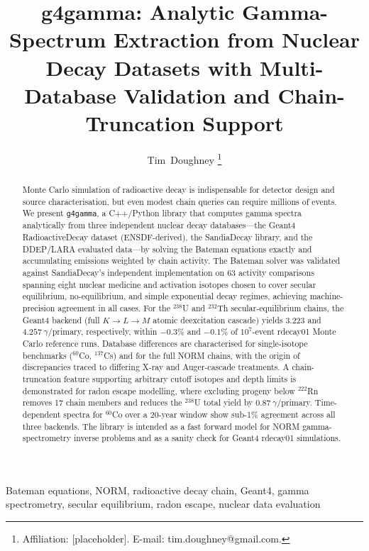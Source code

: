 \documentclass[journal]{IEEEtran}
\title{g4gamma: Analytic Gamma-Spectrum Extraction from Nuclear Decay Datasets
       with Multi-Database Validation and Chain-Truncation Support}
\author{Tim~Doughney%
  \thanks{Affiliation: [placeholder]. E-mail: tim.doughney@gmail.com.}%
}
\begin{document}
\maketitle

\begin{abstract}
Monte Carlo simulation of radioactive decay is indispensable for detector design and
source characterisation, but even modest chain queries can require millions of events.
We present \texttt{g4gamma}, a C++/Python library that computes gamma spectra
analytically from three independent nuclear decay databases---the Geant4
RadioactiveDecay dataset (ENSDF-derived), the SandiaDecay library, and the DDEP/LARA
evaluated data---by solving the Bateman equations exactly and accumulating emissions
weighted by chain activity.
The Bateman solver was validated against SandiaDecay's independent implementation
on 63 activity comparisons spanning eight nuclear medicine and activation isotopes
chosen to cover secular equilibrium, no-equilibrium, and simple exponential
decay regimes, achieving machine-precision agreement in all cases.
For the $^{238}$U and $^{232}$Th secular-equilibrium chains, the Geant4 backend
(full $K\to L\to M$ atomic deexcitation cascade) yields
$3.223$ and $4.257\ \gamma$/primary, respectively, within $-0.3$\% and $-0.1$\%
of $10^7$-event rdecay01 Monte Carlo reference runs.
Database differences are characterised for single-isotope benchmarks ($^{60}$Co,
$^{137}$Cs) and for the full NORM chains, with the origin of discrepancies traced
to differing X-ray and Auger-cascade treatments.
A chain-truncation feature supporting arbitrary cutoff isotopes and depth limits is
demonstrated for radon escape modelling, where excluding progeny below $^{222}$Rn
removes 17 chain members and reduces the $^{238}$U total yield by
$0.87\ \gamma$/primary.
Time-dependent spectra for $^{60}$Co over a 20-year window show sub-1\% agreement
across all three backends.
The library is intended as a fast forward model for NORM gamma-spectrometry inverse
problems and as a sanity check for Geant4 rdecay01 simulations.
\end{abstract}

\begin{IEEEkeywords}
Bateman equations, NORM, radioactive decay chain, Geant4, gamma spectrometry,
secular equilibrium, radon escape, nuclear data evaluation
\end{IEEEkeywords}

\end{document}
